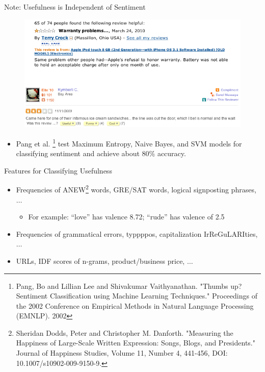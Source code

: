 \documentclass{beamer}
\begin{document}
\begin{frame}{Note: Usefulness is Independent of Sentiment}
\begin{figure}[h]
  \centering
  \includegraphics[scale=.4]{review_ex_2}
\end{figure}
\begin{itemize}
\item Pang et al. \footnote{{\tiny Pang, Bo and Lillian Lee and Shivakumar Vaithyanathan.  "Thumbs
up?  Sentiment Classification using Machine Learning Techniques."
Proceedings of the 2002 Conference on Empirical Methods in Natural
Language Processing (EMNLP). 2002}} test Maximum Entropy, Naive Bayes, and SVM models for classifying sentiment and achieve about 80\% accuracy.\\
\end{itemize}
\end{frame}


\begin{frame}{Features for Classifying Usefulness}
\begin{itemize}
\item Frequencies of ANEW\footnote{{\tiny Sheridan Dodds, Peter and Christopher M. Danforth. "Measuring the Happiness of Large-Scale Written Expression: Songs, Blogs, and Presidents."  Journal of Happiness Studies, Volume 11, Number 4, 441-456, DOI: 10.1007/s10902-009-9150-9. }} words, GRE/SAT words, logical signposting phrases, $\ldots$ 
\begin{itemize}
\item For example: ``love'' has valence 8.72; ``rude'' has valence of 2.5
\end{itemize}
\item Frequencies of grammatical errors, typpppos, capitalization IrReGuLARIties, $\ldots$
\item URLs, IDF scores of n-grams, product/business price, $\ldots$
\end{itemize}
\end{frame}
\end{document}

